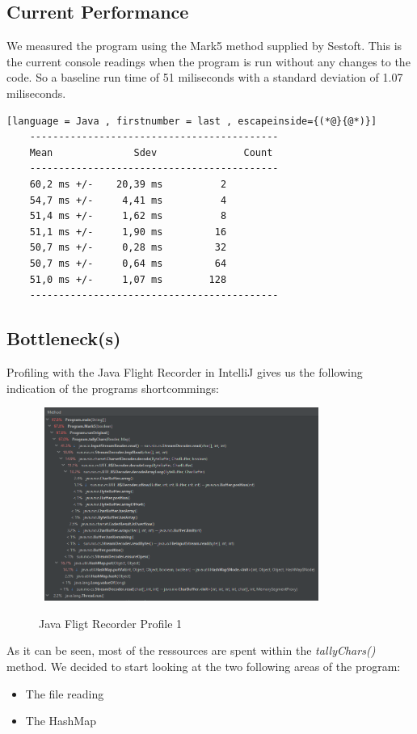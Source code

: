 \vspace{0.5cm}
\subsection{Current Performance}
\label{sec:2.2}
We measured the program using the Mark5 method supplied by Sestoft.\cite{sestoft} \newline
This is the current console readings when the program is run without any changes to the code. 
So a baseline run time of 51 miliseconds with a standard deviation of 1.07 miliseconds. 
\begin{lstlisting}[language = Java , firstnumber = last , escapeinside={(*@}{@*)}]
    -------------------------------------------
    Mean              Sdev               Count
    -------------------------------------------
    60,2 ms +/-    20,39 ms          2
    54,7 ms +/-     4,41 ms          4
    51,4 ms +/-     1,62 ms          8
    51,1 ms +/-     1,90 ms         16
    50,7 ms +/-     0,28 ms         32
    50,7 ms +/-     0,64 ms         64
    51,0 ms +/-     1,07 ms        128
    -------------------------------------------
\end{lstlisting}

\newpage
\subsection{Bottleneck(s)}
\label{sec:2.3}
Profiling with the Java Flight Recorder in IntelliJ gives us the following indication of the programs shortcommings:
\begin{figure}[H]
    \centering\
    \includegraphics[width = 0.8\textwidth ]{figures/profile1.PNG}
    \caption{Java Fligt Recorder Profile 1}
    \label{fig:p1}
\end{figure}
As it can be seen, most of the ressources are spent within the \emph{tallyChars()} method. We decided to start looking at the two following areas of the program:
\begin{itemize}
    \item The file reading
    \item The HashMap 
\end{itemize}

